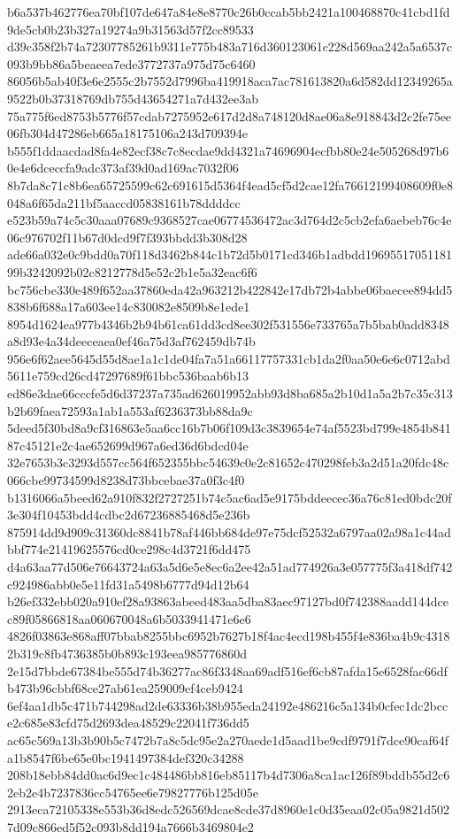 \documentclass[11pt,a4paper]{article}
\begin{document}
{b6a537b462776ea70bf107de647a84e8e8770c26b0ccab5bb2421a100468870c41cbd1fd9de5cb0b23b327a19274a9b31563d57f2cc89533
d39c358f2b74a72307785261b9311e775b483a716d360123061c228d569aa242a5a6537c093b9bb86a5beaeea7ede3772737a975d75c6460
86056b5ab40f3e6e2555c2b7552d7996ba419918aca7ac781613820a6d582dd12349265a9522b0b37318769db755d43654271a7d432ee3ab
75a775f6ed8753b5776f57cdab7275952e617d2d8a748120d8ae06a8e918843d2c2fe75ee06fb304d47286eb665a18175106a243d709394e
b555f1ddaacdad8fa4e82ecf38c7c8ecdae9dd4321a74696904ecfbb80e24e505268d97b60e4e6dceccfa9adc373af39d0ad169ac7032f06
8b7da8c71c8b6ea65725599c62c691615d5364f4ead5cf5d2cae12fa76612199408609f0e8048a6f65da211bf5aaccd05838161b78ddddcc
e523b59a74c5c30aaa07689c9368527cae06774536472ac3d764d2c5cb2efa6aebeb76c4e06c976702f11b67d0dcd9f7f393bbdd3b308d28
ade66a032e0c9bdd0a70f118d3462b844c1b72d5b0171cd346b1adbdd1969551705118199b3242092b02c8212778d5e52c2b1e5a32eac6f6
bc756cbe330e489f652aa37860eda42a963212b422842e17db72b4abbe06baecee894dd5838b6f688a17a603ee14c830082e8509b8e1ede1
8954d1624ea977b4346b2b94b61ca61dd3cd8ee302f531556e733765a7b5bab0add8348a8d93e4a34deeceaea0ef46a75d3af762459db74b
956e6f62aee5645d55d8ae1a1c1de04fa7a51a66117757331cb1da2f0aa50e6e6c0712abd5611e759cd26cd47297689f61bbc536baab6b13
ed86e3dae66cccfe5d6d37237a735ad626019952abb93d8ba685a2b10d1a5a2b7c35c313b2b69faea72593a1ab1a553af6236373bb88da9c
5deed5f30bd8a9cf316863e5aa6cc16b7b06f109d3c3839654e74af5523bd799e4854b84187c45121e2c4ae652699d967a6ed36d6bdcd04e
32e7653b3c3293d557cc564f652355bbc54639c0e2c81652c470298feb3a2d51a20fdc48c066cbe99734599d8238d73bbcebae37a0f3c4f0
b1316066a5beed62a910f832f2727251b74c5ac6ad5e9175bddeecec36a76c81ed0bdc20f3e304f10453bdd4cdbc2d67236885468d5e236b
875914dd9d909c31360dc8841b78af446bb684de97e75dcf52532a6797aa02a98a1c44adbbf774e21419625576cd0ce298c4d3721f6dd475
d4a63aa77d506e76643724a63a5d6e5e8ec6a2ee42a51ad774926a3e057775f3a418df742c924986abb0e5e11fd31a5498b6777d94d12b64
b26ef332ebb020a910ef28a93863abeed483aa5dba83aec97127bd0f742388aadd144dcec89f05866818aa060670048a6b5033941471e6e6
4826f03863e868aff07bbab8255bbc6952b7627b18f4ac4ecd198b455f4e836ba4b9c43182b319c8fb4736385b0b893c193eea985776860d
2e15d7bbde67384be555d74b36277ac86f3348aa69adf516ef6cb87afda15e6528fac66dfb473b96cbbf68ce27ab61ea259009ef4ceb9424
6ef4aa1db5c471b744298ad2de63336b38b955eda24192e486216c5a134b0cfec1dc2bcce2c685e83cfd75d2693dea48529c22041f736dd5
ac65c569a13b3b90b5c7472b7a8c5dc95e2a270aede1d5aad1be9cdf9791f7dce90caf64fa1b8547f6be65e0bc1941497384def320c34288
208b18ebb84dd0ac6d9ec1c484486bb816eb85117b4d7306a8ca1ac126f89bddb55d2c62eb2e4b7237836cc54765ee6e79827776b125d05e
2913eca72105338e553b36d8edc526569dcae8cde37d8960e1c0d35eaa02c05a9821d5027d09c866ed5f52c093b8dd194a7666b3469804e2
}
\end{document}
